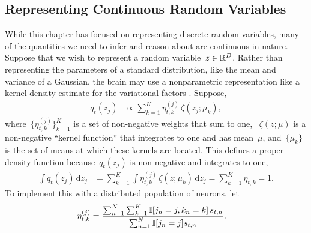 \subsection{Representing Continuous Random Variables}
While this chapter has focused on representing discrete random variables,
many of the quantities we need to infer and reason about are continuous
in nature. 
Suppose that we wish to represent a random variable~$z \in \mathbb{R}^D$.
Rather than representing the parameters of a standard distribution, like the
mean and variance of a Gaussian, the brain may use a nonparametric
representation like a kernel density estimate for the variational factors
\cite{Anderson1994, Barber2003}.
Suppose,
\begin{align}
  q_t(z_j) &\propto
  \sum_{k=1}^K \eta_{t,k}^{(j)} \, \zeta(z_j; \mu_k),
\end{align}
where~$\{\eta_{t,k}^{(j)}\}_{k=1}^K$ is a set of non-negative weights that
sum to one, ~$\zeta(z; \mu)$ is a non-negative ``kernel function''
that integrates to one and has mean~$\mu$, and~$\{\mu_k\}$ is the set of
means at which these kernels are located. This defines a proper
density function because~$q_t(z_j)$ is non-negative and integrates to one,
\begin{align}
  \int q_t(z_j) \, \mathrm{d}z_j &=
  \sum_{k=1}^K  \int \eta_{t,k}^{(j)} \, \zeta(z; \mu_k) \, \mathrm{d}z_j
  = \sum_{k=1}^K \eta_{t,k} = 1.
\end{align}
To implement this with a distributed population of neurons, let
\begin{align}
  \eta_{t,k}^{(j)} &=
  \frac{\sum_{n=1}^N \sum_{k=1}^K \mathbb{I}[j_n=j, k_n=k] \, s_{t,n}}
       {\sum_{n=1}^N \mathbb{I}[j_n=j] s_{t,n}}.
\end{align}

